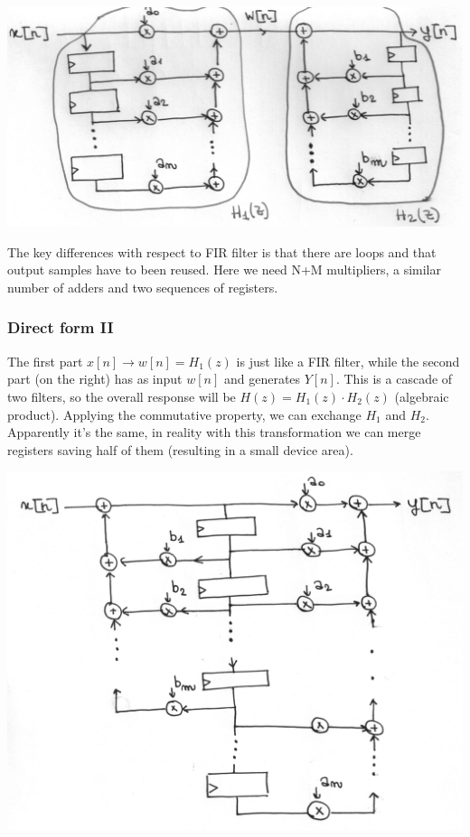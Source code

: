 \begin{center}
  \includegraphics[width=0.7\linewidth]{img/img1/06}
\end{center}

The key differences with respect to FIR filter is that there are loops and that output samples have to been reused. Here we need N+M multipliers, a similar number of adders and two sequences of registers.

\subsubsection{Direct form II}
The first part $x[n] \rightarrow w[n] = H_1(z)$ is just like a FIR filter, while the second part (on the right) has as input $w[n]$ and generates $Y[n]$. This is a cascade of two filters, so the overall response will be $H(z)=H_1(z) \cdot H_2(z)$ (algebraic product). Applying the commutative property, we can exchange $H_1$ and $H_2$. Apparently it's the same, in reality with this transformation we can merge registers saving half of them (resulting in a small device area).
\begin{center}
  \includegraphics[width=0.7\linewidth]{img/img1/07}
\end{center}


